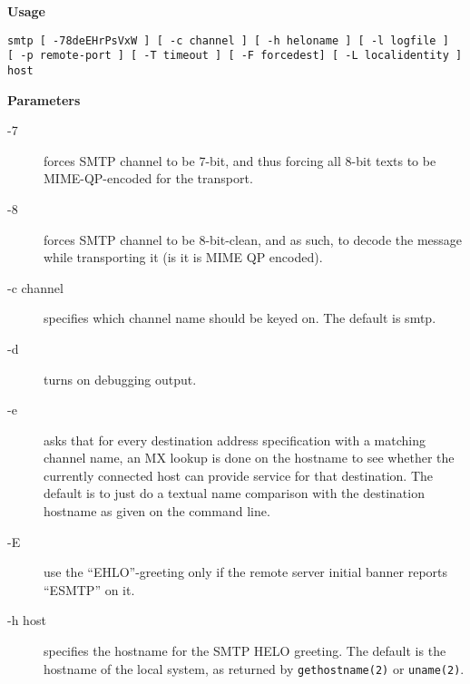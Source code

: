 {\bf Usage}

\begin{tscreen}
\begin{verbatim}
smtp [ -78deEHrPsVxW ] [ -c channel ] [ -h heloname ] [ -l logfile ] 
[ -p remote-port ] [ -T timeout ] [ -F forcedest] [ -L localidentity ] host
\end{verbatim}
\end{tscreen}


{\bf Parameters}

\begin{description}
\item[-7] \mbox{}

forces SMTP channel to be 7-bit, and thus forcing
all 8-bit texts to be MIME-QP-encoded for the transport.



\item[-8] \mbox{}

forces SMTP channel to be 8-bit-clean, and as such,
to decode the message while transporting it (is it
is MIME QP encoded).



\item[-c channel] \mbox{}

specifies which channel name should be keyed on.
The default is smtp.



\item[-d] \mbox{}

turns on debugging output.



\item[-e] \mbox{}

asks that for every destination address specification 
with a matching channel name, an MX lookup is
done on the hostname to see whether the currently
connected host can provide service for that destination. 
The default is to just do a textual name
comparison with the destination hostname as given
on the command line.



\item[-E] \mbox{}

use the ``EHLO''-greeting only if the remote server
initial banner reports ``ESMTP'' on it.



\item[-h host] \mbox{}

specifies the hostname for the SMTP HELO greeting.
The default is the hostname of the local system, as
returned by {\tt gethostname(2)} or {\tt uname(2)}.




\end{description}
